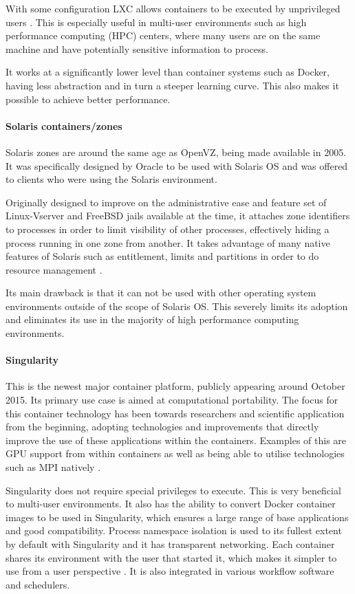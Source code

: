 With some configuration LXC allows containers to be executed by unprivileged users \parencite{linuxcontainerscom}. This is especially useful in multi-user environments such as high performance computing (HPC) centers, where many users are on the same machine and have potentially sensitive information to process.

It works at a significantly lower level than container systems such as Docker, having less abstraction and in turn a steeper learning curve. This also makes it possible to achieve better performance.

\paragraph{Solaris containers/zones}
Solaris zones are around the same age as OpenVZ, being made available in 2005. It was specifically designed by Oracle to be used with Solaris OS and was offered to clients who were using the Solaris environment. 

Originally designed to improve on the administrative ease and feature set of Linux-Vserver and FreeBSD jails available at the time, it attaches zone identifiers to processes in order to limit visibility of other processes, effectively hiding a process running in one zone from another. It takes advantage of many native features of Solaris such as entitlement, limits and partitions in order to do resource management \parencite{price2004solaris}.

Its main drawback is that it can not be used with other operating system environments outside of the scope of Solaris OS. This severely limits its adoption and eliminates its use in the majority of high performance computing environments.

\paragraph{Singularity}
This is the newest major container platform, publicly appearing around October 2015. Its primary use case is aimed at computational portability. The focus for this container technology has been towards researchers and scientific application from the beginning, adopting technologies and improvements that directly improve the use of these applications within the containers. Examples of this are GPU support from within containers as well as being able to utilise technologies such as MPI natively \parencite{arango2017performance,benedicic2017portable}.

Singularity does not require special privileges to execute. This is very beneficial to multi-user environments. It also has the ability to convert Docker container images to be used in Singularity, which ensures a large range of base applications and good compatibility. Process namespace isolation is used to its fullest extent by default with Singularity and it has transparent networking. Each container shares its environment with the user that started it, which makes it simpler to use from a user perspective \parencite{xavier2013performance}. It is also integrated in various workflow software and schedulers.

